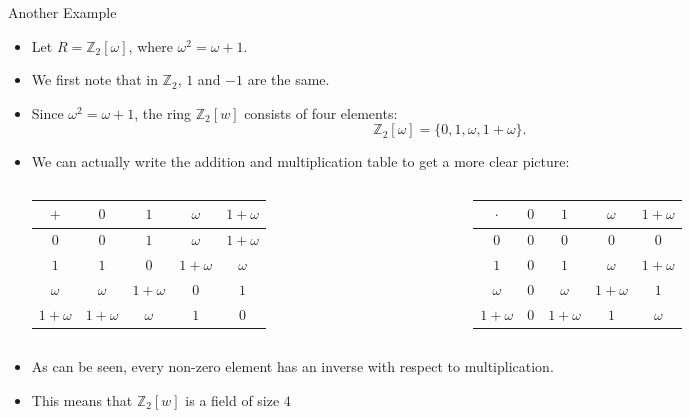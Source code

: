 \documentclass[ %
 10pt, xcolor={dvipsnames,svgnames,x11names,hyperref},
   hyperref={colorlinks=true,citecolor=green,linkcolor=DarkRed,urlcolor=ProcessBlue,anchorcolor=blue}
  ]{beamer}
\newenvironment{stepitemize}{\begin{itemize}[<+->]}{\end{itemize} }
\newcommand{\Z}{\mathbb{Z}}
\begin{document}
\begin{frame}{Another Example}
\begin{stepitemize}
    \item Let $R = \Z_2[\omega]$, where $\omega^2=\omega+1$. \item We first note that in $\Z_2$, $1$ and $-1$ are the same. 
    \item Since $\omega^2=\omega+1$, the ring $\Z_2[w]$ consists of four elements:
    $$\Z_2[\omega] = \{0, 1, \omega, 1+\omega\}.$$
    \item We can actually write the addition and multiplication table to get a more clear picture:
    \begin{columns}
        \begin{column}{0.5\textwidth}
     \begin{table}
\begin{tabular}{ c| c | c |c|c}
$+$  & $0$ & $1$ & $\omega$ & $1+\omega$ \\
\hline
$0$ & $0$ & $1$ & $\omega$ & $1+\omega$  \\ 
\hline
$1$ & $1$ & $0$ & $1+\omega$ & $\omega$  \\ 
\hline
$\omega$ & $\omega$ & $1+\omega$ & $0$ & $1$ \\ 
\hline
$1+\omega$ & $1+\omega$& $\omega$ & $1$&$0$\\
\end{tabular}
\end{table}
    \end{column}
    
        \begin{column}{0.4\textwidth}
    \begin{table}
\begin{tabular}{ c| c | c |c|c}
$\cdot$  & $0$ & $1$ & $\omega$ & $1+\omega$ \\
\hline
$0$ & $0$ & $0$ & $0$ & $0$  \\ 
\hline
$1$ & $0$ & $1$ & $\omega$ & $1+\omega$  \\ 
\hline
$\omega$ & $0$ & $\omega$ & $1+\omega$ & $1$ \\ 
\hline
$1+\omega$ & $0$& $1+\omega$ & $1$&$\omega$\\
\end{tabular}
\end{table}
    \end{column}
\end{columns}
\item As can be seen, every non-zero element has an inverse with respect to multiplication. 
\item This means that $\Z_2[w]$ is a field of size $4$
    \end{stepitemize}
    \end{frame}
\end{document}
